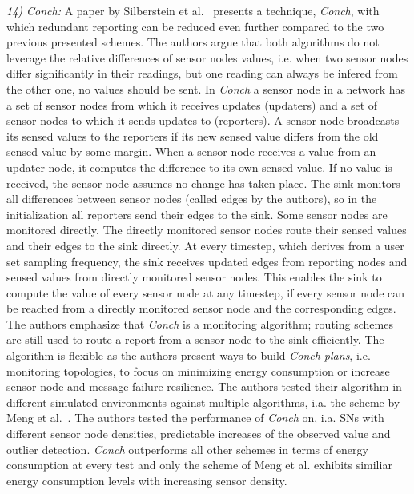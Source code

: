 \textit{14) Conch:}
A paper by Silberstein et al.~\cite{silberstein2006constraint} presents a
technique, \textit{Conch}, with which redundant reporting can be reduced even
further compared to the two previous presented schemes. The authors argue that
both algorithms do not leverage the relative differences of sensor nodes
values, i.e. when two sensor nodes differ significantly in their readings, but
one reading can always be infered from the other one, no values should be sent.
In \textit{Conch} a sensor node in a network has a set of sensor nodes from
which it receives updates (updaters) and a set of sensor nodes to which it
sends updates to (reporters). A sensor node broadcasts its sensed values to the
reporters if its new sensed value differs from the old sensed value by some
margin. When a sensor node receives a value from an updater node, it computes
the difference to its own sensed value. If no value is received, the sensor
node assumes no change has taken place. The sink monitors all
differences between sensor nodes (called edges by the authors), so in the
initialization all reporters send their edges to the sink. Some sensor
nodes are monitored directly. The directly monitored sensor nodes route their
sensed values and their edges to the sink directly. At every timestep,
which derives from a user set sampling frequency, the sink receives
updated edges from reporting nodes and sensed values from directly monitored
sensor nodes. This enables the sink to compute the value of every
sensor node at any timestep, if every sensor node can be reached from a
directly monitored sensor node and the corresponding edges. The authors
emphasize that \textit{Conch} is a monitoring algorithm; routing schemes are
still used to route a report from a sensor node to the sink
efficiently. The algorithm is flexible as the authors present ways to build
\textit{Conch plans}, i.e. monitoring topologies, to focus on minimizing energy
consumption or increase sensor node and message failure resilience. The authors
tested their algorithm in different simulated environments against multiple
algorithms, i.a. the scheme by Meng et al.~\cite{meng2004event}. The authors
tested the performance of \textit{Conch} on, i.a. \acp{SN} with different
sensor node densities, predictable increases of the observed value and outlier
detection. \textit{Conch} outperforms all other schemes in terms of energy
consumption at every test and only the scheme of Meng et al. exhibits similiar
energy consumption levels with increasing sensor density.


